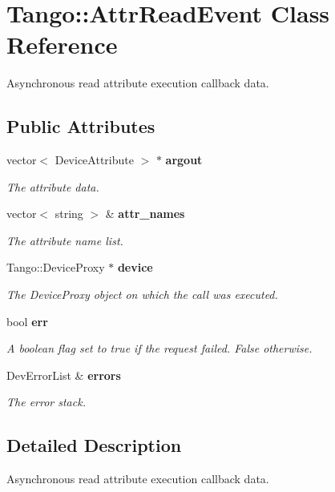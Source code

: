 \section{Tango\-:\-:Attr\-Read\-Event Class Reference}
\label{classTango_1_1AttrReadEvent}


Asynchronous read attribute execution callback data.  


\subsection*{Public Attributes}
\begin{DoxyCompactItemize}
\item 
vector$<$ Device\-Attribute $>$ $\ast$ {\bf argout}
\begin{DoxyCompactList}\small\item\em The attribute data. \end{DoxyCompactList}\item 
vector$<$ string $>$ \& {\bf attr\-\_\-names}
\begin{DoxyCompactList}\small\item\em The attribute name list. \end{DoxyCompactList}\item 
Tango\-::\-Device\-Proxy $\ast$ {\bf device}
\begin{DoxyCompactList}\small\item\em The Device\-Proxy object on which the call was executed. \end{DoxyCompactList}\item 
bool {\bf err}
\begin{DoxyCompactList}\small\item\em A boolean flag set to true if the request failed. False otherwise. \end{DoxyCompactList}\item 
Dev\-Error\-List \& {\bf errors}
\begin{DoxyCompactList}\small\item\em The error stack. \end{DoxyCompactList}\end{DoxyCompactItemize}


\subsection{Detailed Description}
Asynchronous read attribute execution callback data. 

